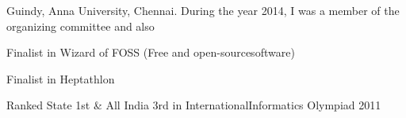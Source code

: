 \begin{cventries}
\begin{cvitems}
        \item{Guindy,​ Anna​ University,​ Chennai.​ During​ the​ year​ 2014,​ I was​ a member​ of​ the​ organizing​ committee​ and​ also}
        \item{  Finalist​ in​ Wizard​ of​ FOSS​ (Free​ and​ open-source​ software)}
        \item{  Finalist​ in​ Heptathlon}
        \item{Ranked​ State​ 1st​ \& All​ India​ 3rd​ in​ International​ Informatics​ Olympi}ad​ 2011
      \end{cvitems}
\end{cventries}
